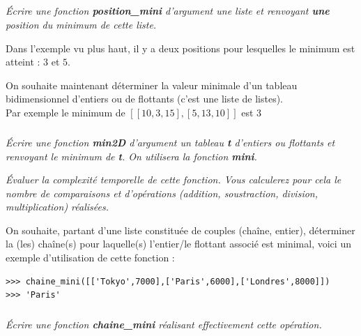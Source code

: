 \documentclass[10pt,fleqn]{article} %
\begin{document}
 \subparagraph{}
\textit{ Écrire une fonction \textbf{position\_mini} d'argument une liste et renvoyant \textbf{une} position
  du minimum de cette liste.\\}
  
 Dans  l'exemple vu plus haut,  il y a deux positions pour lesquelles
  le minimum est atteint : $3$ et $5$.
	
\ifprof
\begin{corrige}
\end{corrige}
\else
\fi
  
On souhaite maintenant déterminer la valeur minimale d'un tableau
  bidimensionnel d'entiers ou de flottants (c'est une liste de listes).\\
  Par exemple le minimum de $[[10,3,15],[5,13,10]]$ est $3$
  
\subparagraph{}
\textit{Écrire une fonction \textbf{min2D} d'argument un tableau \textbf{t} d'entiers ou flottants 
et renvoyant le minimum de \textbf{t}. On utilisera la fonction \textbf{mini}.}

\ifprof
\begin{corrige}
\end{corrige}
\else
\fi

\textit{Évaluer la complexité temporelle de cette fonction.
Vous calculerez pour cela le nombre de comparaisons et d'opérations (addition, soustraction, division, multiplication) réalisées.}
  
On souhaite, partant d'une liste constituée de couples
  (chaîne, entier), déterminer la (les) chaîne(s) pour laquelle(s) l'entier/le flottant 
  associé est minimal, voici un exemple d'utilisation de cette fonction :
\begin{py}
\begin{lstlisting}
>>> chaine_mini([['Tokyo',7000],['Paris',6000],['Londres',8000]]) 
>>> 'Paris'
\end{lstlisting}
\end{py}
\subparagraph{}
\textit{Écrire une fonction \textbf{chaine\_mini} réalisant effectivement cette opération.}
\end{document}
